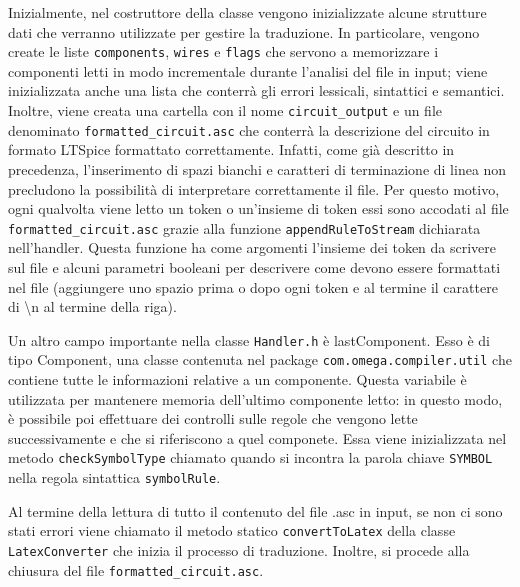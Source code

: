 \noindent
Inizialmente, nel costruttore della classe vengono inizializzate alcune strutture dati che verranno utilizzate per gestire la traduzione. In particolare, vengono create le liste \texttt{components}, \texttt{wires} e \texttt{flags} che servono a memorizzare i componenti letti in modo incrementale durante l'analisi del file in input; viene inizializzata anche una lista che conterrà gli errori lessicali, sintattici e semantici. Inoltre, viene creata una cartella con il nome \texttt{circuit\_output} e un file denominato \texttt{formatted\_circuit.asc} che conterrà la descrizione del circuito in formato LTSpice formattato correttamente. Infatti, come già descritto in precedenza, l'inserimento di spazi bianchi e caratteri di terminazione di linea non precludono la possibilità di interpretare correttamente il file. Per questo motivo, ogni qualvolta viene letto un token o un'insieme di token essi sono accodati al file \texttt{formatted\_circuit.asc} grazie alla funzione \texttt{appendRuleToStream} dichiarata nell'handler. Questa funzione ha come argomenti l'insieme dei token da scrivere sul file e alcuni parametri booleani per descrivere come devono essere formattati nel file (aggiungere uno spazio prima o dopo ogni token e al termine il carattere di \textbackslash n al termine della riga). 

\noindent
Un altro campo importante nella classe \texttt{Handler.h} è lastComponent. Esso è di tipo Component, una classe contenuta nel package \texttt{com.omega.compiler.util} che contiene tutte le informazioni relative a un componente. Questa variabile è utilizzata per mantenere memoria dell'ultimo componente letto: in questo modo, è possibile poi effettuare dei controlli sulle regole che vengono lette successivamente e che si riferiscono a quel componete. Essa viene inizializzata nel metodo \texttt{checkSymbolType} chiamato quando si incontra la parola chiave \texttt{SYMBOL} nella regola sintattica \texttt{symbolRule}.

\noindent
Al termine della lettura di tutto il contenuto del file .asc in input, se non ci sono stati errori viene chiamato il metodo statico \texttt{convertToLatex} della classe \texttt{LatexConverter} che inizia il processo di traduzione. Inoltre, si procede alla chiusura del file \texttt{formatted\_circuit.asc}.

